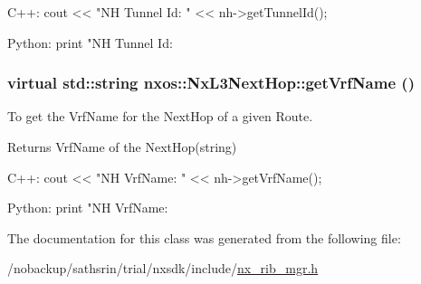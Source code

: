 \begin{DoxyCode}
  C++:
       cout << "NH Tunnel Id: " << nh->getTunnelId();

  Python:
       print "NH Tunnel Id: %
\end{DoxyCode}
 \hypertarget{classnxos_1_1NxL3NextHop_ab4488d93cc0df12157430dd86f5f4242}{
\subsubsection[{getVrfName}]{\setlength{\rightskip}{0pt plus 5cm}virtual std::string nxos::NxL3NextHop::getVrfName ()}}
\label{classnxos_1_1NxL3NextHop_ab4488d93cc0df12157430dd86f5f4242}
To get the VrfName for the NextHop of a given Route.

\begin{DoxyReturn}{Returns}
VrfName of the NextHop(string)
\end{DoxyReturn}

\begin{DoxyCode}
  C++:
       cout << "NH VrfName: " << nh->getVrfName();

  Python:
       print "NH VrfName: %
\end{DoxyCode}
 

The documentation for this class was generated from the following file:\begin{DoxyCompactItemize}
\item 
/nobackup/sathsrin/trial/nxsdk/include/\hyperlink{nx__rib__mgr_8h}{nx\_\-rib\_\-mgr.h}\end{DoxyCompactItemize}
